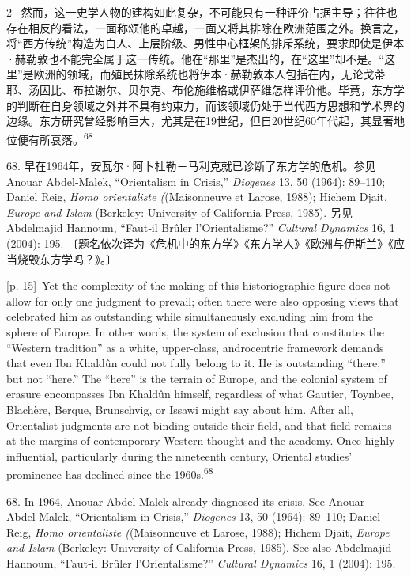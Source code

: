 \documentclass[10pt,a4paper]{article}
\begin{document}
\begin{paracol}{2}
\switchcolumn*
{\scriptsize\color{gray} [p. 15]}\ 然而，这一史学人物的建构如此复杂，不可能只有一种评价占据主导；往往也存在相反的看法，一面称颂他的卓越，一面又将其排除在欧洲范围之外。换言之，将“西方传统”构造为白人、上层阶级、男性中心框架的排斥系统，要求即使是伊本·赫勒敦也不能完全属于这一传统。他在“那里”是杰出的，在“这里”却不是。“这里”是欧洲的领域，而殖民抹除系统也将伊本·赫勒敦本人包括在内，无论戈蒂耶、汤因比、布拉谢尔、贝尔克、布伦施维格或伊萨维怎样评价他。毕竟，东方学的判断在自身领域之外并不具有约束力，而该领域仍处于当代西方思想和学术界的边缘。东方研究曾经影响巨大，尤其是在19世纪，但自20世纪60年代起，其显著地位便有所衰\mbox{落。\textsuperscript{68}}\par{\small 68. 早在1964年，安瓦尔·阿卜杜勒－马利克就已诊断了东方学的危机。参见 Anouar Abdel‑Malek, “Orientalism in Crisis,” \textit{Diogenes} 13, 50 (1964): 89–110; Daniel Reig, \textit{Homo orientaliste (}(Maisonneuve et Larose, 1988); Hichem Djait, \textit{Europe and Islam} (Berkeley: University of California Press, 1985). 另见 Abdelmajid Hannoum, “Faut‑il Brûler l’Orientalisme?” \textit{Cultural Dynamics} 16, 1 (2004): 195. 〔题名依次译为《危机中的东方学》《东方学人》《欧洲与伊斯兰》《应当烧毁东方学吗？》。〕\par}
\switchcolumn
{\scriptsize\color{gray} [p. 15]}\ Yet the complexity of the making of this historiographic figure does not allow for only one judgment to prevail; often there were also opposing views that celebrated him as outstanding while simultaneously excluding him from the sphere of Europe. In other words, the system of exclusion that constitutes the “Western tradition” as a white, upper-class, androcentric framework demands that even Ibn Khaldûn could not fully belong to it. He is outstanding “there,” but not “here.” The “here” is the terrain of Europe, and the colonial system of erasure encompasses Ibn Khaldûn himself, regardless of what Gautier, Toynbee, Blachère, Berque, Brunschvig, or Issawi might say about him. After all, Orientalist judgments are not binding outside their field, and that field remains at the margins of contemporary Western thought and the academy. Once highly influential, particularly during the nineteenth century, Oriental studies’ prominence has declined since the 1960s.\nobreak\textsuperscript{68}\par{\small 68. In 1964, Anouar Abdel‑Malek already diagnosed its crisis. See Anouar Abdel‑Malek, “Orientalism in Crisis,” \textit{Diogenes} 13, 50 (1964): 89–110; Daniel Reig, \textit{Homo orientaliste (}(Maisonneuve et Larose, 1988); Hichem Djait, \textit{Europe and Islam} (Berkeley: University of California Press, 1985). See also Abdelmajid Hannoum, “Faut‑il Brûler l’Orientalisme?” \textit{Cultural Dynamics} 16, 1 (2004): 195.\par}

\end{paracol}
\end{document}
